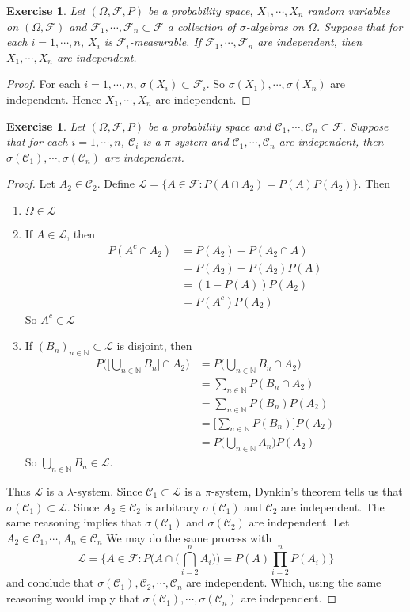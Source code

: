 \documentclass[12pt]{amsart}
\newtheorem{ex}[thm]{Exercise}
\newcommand{\lam}{\lambda}
\newcommand{\sig}{\sigma}
\newcommand{\Om}{\Omega}
\newcommand{\N}{\mathbb{N}}
\newcommand{\MC}{\mathcal{C}}
\newcommand{\MF}{\mathcal{F}}
\newcommand{\ML}{\mathcal{L}}
\begin{document}
\begin{ex}
	Let $(\Om, \MF, P)$ be a probability space, $X_1, \cdots, X_n$ random variables on $(\Om, \MF)$ and $\MF_1, \cdots, \MF_n \subset \MF$ a collection of $\sig$-algebras on $\Om$. Suppose that for each $i = 1, \cdots, n$, $X_i$ is $\MF_i$-measurable. If $\MF_1, \cdots, \MF_n$ are independent, then $X_1, \cdots, X_n$ are independent. 
\end{ex}

\begin{proof}
	For each $i =1, \cdots, n$, $\sig(X_i) \subset \MF_i$. So $\sig(X_1), \cdots, \sig(X_n)$ are independent. Hence $X_1, \cdots, X_n$ are independent.
\end{proof}

\begin{ex}
	Let $(\Om, \MF, P)$ be a probability space and $\MC_1, \cdots, \MC_n \subset \MF$. Suppose that for each $i = 1, \cdots, n$, $\MC_i$ is a $\pi$-system and $\MC_1, \cdots, \MC_n$ are independent, then $\sig(\MC_1), \cdots, \sig(\MC_n)$ are independent.
\end{ex}

\begin{proof}
	Let $A_2 \in \MC_2$. Define $\ML = \{A \in \MF: P(A\cap A_2) = P(A)P(A_2)\}$. Then 
	\begin{enumerate}
		\item $\Om \in \ML$
		\item If $A \in \ML$, then 
		\begin{align*}
			P(A^c \cap A_2) 
			&= P(A_2) - P(A_2 \cap A) \\
			&= P(A_2) - P(A_2) P(A) \\
			&= (1- P(A))P(A_2) \\
			&= P(A^c)P(A_2)
		\end{align*}
		So $A^c \in \ML$
		\item If $(B_n)_{n \in \N} \subset \ML$ is disjoint, then 
		\begin{align*}
			P\bigg( \bigg[\bigcup_{n \in \N}B_n \bigg] \cap A_2\bigg) 
			&= P \bigg( \bigcup_{n \in \N}B_n \cap A_2 \bigg) \\
			&= \sum_{n \in \N}P(B_n \cap A_2) \\
			&= \sum_{n \in \N}P(B_n) P(A_2) \\
			&=   \bigg[\sum_{n \in \N}P(B_n)\bigg]P(A_2)  \\
			&=  P\bigg( \bigcup_{n \in \N} A_n\bigg) P(A_2) 
		\end{align*} 
		So $\bigcup\limits_{n \in \N}B_n \in \ML$. 
	\end{enumerate}
	Thus $\ML$ is a $\lam$-system. Since $\MC_1 \subset \ML$ is a $\pi$-system, Dynkin's theorem tells us that $\sig(\MC_1) \subset \ML$. Since $A_2 \in \MC_2$ is arbitrary $\sig(\MC_1)$ and $\MC_2$ are independent. The same reasoning implies that $\sig(\MC_1)$ and $\sig(\MC_2)$ are independent. Let $A_2 \in \MC_1, \cdots, A_n \in \MC_n$ We may do the same process with $$\ML = \bigg \{A \in \MF: P\bigg(A \cap \bigg(\bigcap_{i=2}^n A_i\bigg) \bigg) = P(A)\prod_{i=2}^n P(A_i)\bigg\}$$ and conclude that $\sig(\MC_1), \MC_2, \cdots, \MC_n$ are independent. Which, using the same reasoning would imply that $\sig(\MC_1), \cdots, \sig(\MC_n)$ are independent.
\end{proof}
\end{document}
